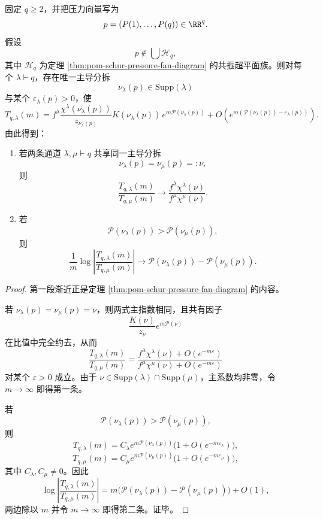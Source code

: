 \begin{theorem}\label{thm:xi-time-part63c-generic-pressure-fan-ratio-law}
固定 \(q\ge 2\)，并把压力向量写为
\[
p=(P(1),\dots,P(q))\in\RR^q.
\]
假设
\[
p\notin \bigcup\mathcal H_q,
\]
其中 \(\mathcal H_q\) 为定理 \ref{thm:pom-schur-pressure-fan-diagram} 的共振超平面族。则对每个 \(\lambda\vdash q\)，存在唯一主导分拆
\[
\nu_\lambda(p)\in \mathrm{Supp}(\lambda)
\]
与某个 \(\varepsilon_\lambda(p)>0\)，使
\[
T_{q,\lambda}(m)
=
f^\lambda\frac{\chi^\lambda(\nu_\lambda(p))}{z_{\nu_\lambda(p)}}K(\nu_\lambda(p))\,e^{m\mathcal P(\nu_\lambda(p))}
+O\!\left(e^{m(\mathcal P(\nu_\lambda(p))-\varepsilon_\lambda(p))}\right).
\]
由此得到：
\begin{enumerate}
  \item 若两条通道 \(\lambda,\mu\vdash q\) 共享同一主导分拆
  \[
  \nu_\lambda(p)=\nu_\mu(p)=:\nu,
  \]
  则
  \[
  \boxed{\;
  \frac{T_{q,\lambda}(m)}{T_{q,\mu}(m)}
  \longrightarrow
  \frac{f^\lambda\chi^\lambda(\nu)}{f^\mu\chi^\mu(\nu)}.\;}
  \]
  \item 若
  \[
  \mathcal P(\nu_\lambda(p))>\mathcal P(\nu_\mu(p)),
  \]
  则
  \[
  \boxed{\;
  \frac{1}{m}\log\left|\frac{T_{q,\lambda}(m)}{T_{q,\mu}(m)}\right|
  \longrightarrow
  \mathcal P(\nu_\lambda(p))-\mathcal P(\nu_\mu(p)).\;}
  \]
\end{enumerate}
\end{theorem}
\begin{proof}
第一段渐近正是定理 \ref{thm:pom-schur-pressure-fan-diagram} 的内容。

若 \(\nu_\lambda(p)=\nu_\mu(p)=\nu\)，则两式主指数相同，且共有因子
\[
\frac{K(\nu)}{z_\nu}e^{m\mathcal P(\nu)}
\]
在比值中完全约去，从而
\[
\frac{T_{q,\lambda}(m)}{T_{q,\mu}(m)}
=
\frac{f^\lambda\chi^\lambda(\nu)+O(e^{-m\varepsilon})}
{f^\mu\chi^\mu(\nu)+O(e^{-m\varepsilon})}
\]
对某个 \(\varepsilon>0\) 成立。由于 \(\nu\in\mathrm{Supp}(\lambda)\cap\mathrm{Supp}(\mu)\)，主系数均非零，令 \(m\to\infty\) 即得第一条。

若
\[
\mathcal P(\nu_\lambda(p))>\mathcal P(\nu_\mu(p)),
\]
则
\[
T_{q,\lambda}(m)=C_\lambda e^{m\mathcal P(\nu_\lambda(p))}\bigl(1+O(e^{-m\varepsilon_\lambda})\bigr),
\]
\[
T_{q,\mu}(m)=C_\mu e^{m\mathcal P(\nu_\mu(p))}\bigl(1+O(e^{-m\varepsilon_\mu})\bigr),
\]
其中 \(C_\lambda,C_\mu\neq 0\)。因此
\[
\log\left|\frac{T_{q,\lambda}(m)}{T_{q,\mu}(m)}\right|
=
m\bigl(\mathcal P(\nu_\lambda(p))-\mathcal P(\nu_\mu(p))\bigr)+O(1),
\]
两边除以 \(m\) 并令 \(m\to\infty\) 即得第二条。证毕。
\end{proof}

